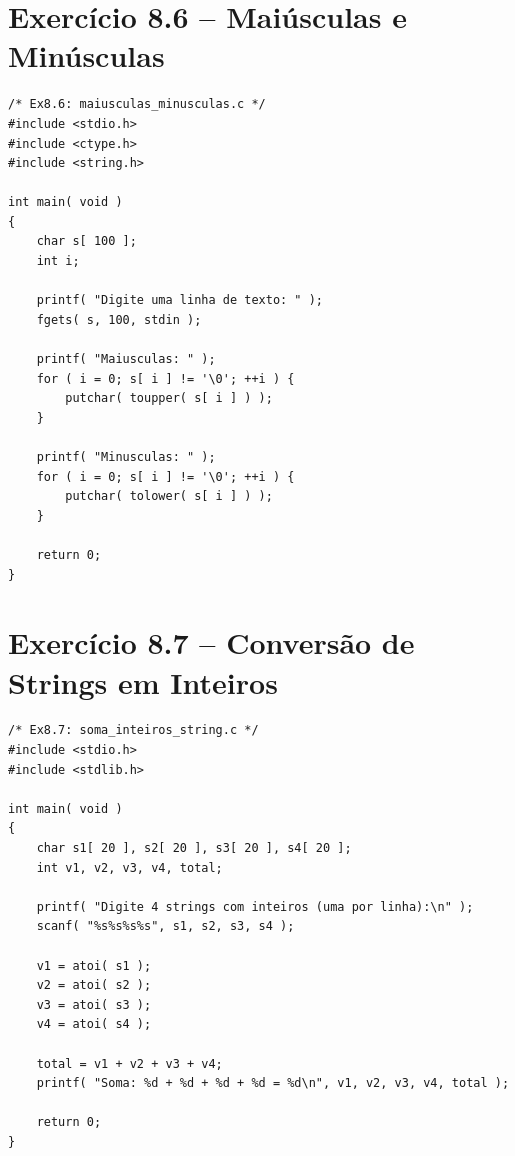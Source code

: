\documentclass[12pt,a4paper]{article}
\begin{document}
\section{Exercício 8.6 -- Maiúsculas e Minúsculas}

\begin{respostabox}
\begin{lstlisting}
/* Ex8.6: maiusculas_minusculas.c */
#include <stdio.h>
#include <ctype.h>
#include <string.h>

int main( void )
{
    char s[ 100 ];
    int i;

    printf( "Digite uma linha de texto: " );
    fgets( s, 100, stdin );

    printf( "Maiusculas: " );
    for ( i = 0; s[ i ] != '\0'; ++i ) {
        putchar( toupper( s[ i ] ) );
    }

    printf( "Minusculas: " );
    for ( i = 0; s[ i ] != '\0'; ++i ) {
        putchar( tolower( s[ i ] ) );
    }

    return 0;
}
\end{lstlisting}
\end{respostabox}

\section{Exercício 8.7 -- Conversão de Strings em Inteiros}

\begin{respostabox}
\begin{lstlisting}
/* Ex8.7: soma_inteiros_string.c */
#include <stdio.h>
#include <stdlib.h>

int main( void )
{
    char s1[ 20 ], s2[ 20 ], s3[ 20 ], s4[ 20 ];
    int v1, v2, v3, v4, total;

    printf( "Digite 4 strings com inteiros (uma por linha):\n" );
    scanf( "%s%s%s%s", s1, s2, s3, s4 );

    v1 = atoi( s1 );
    v2 = atoi( s2 );
    v3 = atoi( s3 );
    v4 = atoi( s4 );

    total = v1 + v2 + v3 + v4;
    printf( "Soma: %d + %d + %d + %d = %d\n", v1, v2, v3, v4, total );

    return 0;
}
\end{lstlisting}
\end{respostabox}
\end{document}
